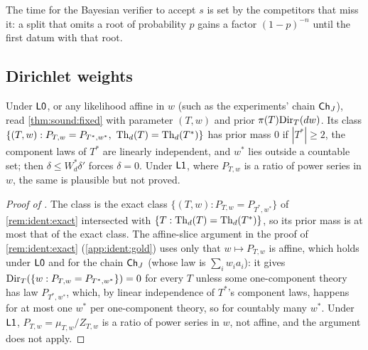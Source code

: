 \noindent The time for the Bayesian verifier to accept $s$ is set by the competitors that miss it: a split that omits a root of probability $p$ gains a factor $(1-p)^{-n}$ until the first datum with that root.

\subsection{Dirichlet weights}\label{app:sound:dir}

\begin{remark}\label{rem:sound:vacuous}
Under $\mathord{\mathsf{L0}}$, or any likelihood affine in $w$ (such as the experiments' chain $\mathsf{Ch}_{J}$), read \cref{thm:sound:fixed} with parameter $(T,w)$ and prior $\pi(T)\mathrm{Dir}_T(dw)$. Its class $\{(T,w):P_{T,w}=P_{T^*,w^*},\ \Th_d(T)=\Th_d(T^*)\}$ has prior mass $0$ if $|T^*|\ge2$, the component laws of $T^*$ are linearly independent, and $w^*$ lies outside a countable set; then $\delta\le W^*_d\delta'$ forces $\delta=0$. Under $\mathord{\mathsf{L1}}$, where $P_{T,w}$ is a ratio of power series in $w$, the same is plausible but not proved.
\end{remark}

\begin{proof}[Proof of ]
The class is the exact class $\{(T,w):P_{T,w}=P_{T^*,w^*}\}$ of \cref{rem:ident:exact} intersected with $\{T:\mathrm{Th}_d(T)=\mathrm{Th}_d(T^*)\}$, so its prior mass is at most that of the exact class. The affine-slice argument in the proof of \cref{rem:ident:exact} (\cref{app:ident:gold}) uses only that $w\mapsto P_{T,w}$ is affine, which holds under $\mathord{\mathsf{L0}}$ and for the chain $\mathsf{Ch}_{J}$ (whose law is $\sum_iw_ia_i$): it gives $\mathrm{Dir}_T(\{w:P_{T,w}=P_{T^*,w^*}\})=0$ for every $T$ unless some one-component theory has law $P_{T^*,w^*}$, which, by linear independence of $T^*$'s component laws, happens for at most one $w^*$ per one-component theory, so for countably many $w^*$. Under $\mathord{\mathsf{L1}}$, $P_{T,w}=\mu_{T,w}/Z_{T,w}$ is a ratio of power series in $w$, not affine, and the argument does not apply.
\end{proof}

